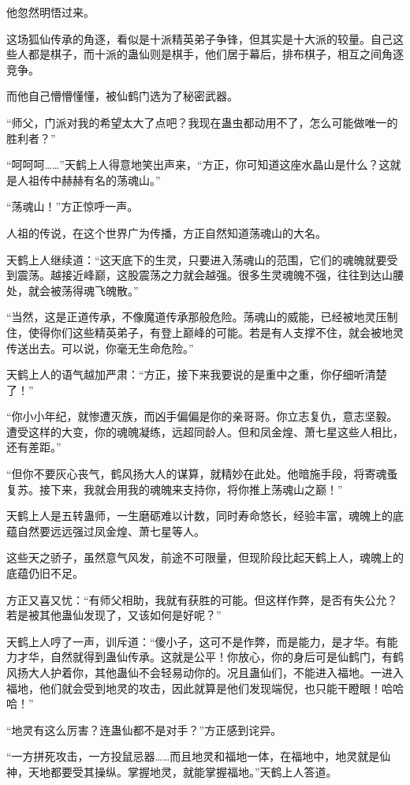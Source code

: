 \begin{this_body}
他忽然明悟过来。

这场狐仙传承的角逐，看似是十派精英弟子争锋，但其实是十大派的较量。自己这些人都是棋子，而十派的蛊仙则是棋手，他们居于幕后，排布棋子，相互之间角逐竞争。

而他自己懵懵懂懂，被仙鹤门选为了秘密武器。

“师父，门派对我的希望太大了点吧？我现在蛊虫都动用不了，怎么可能做唯一的胜利者？”

“呵呵呵……”天鹤上人得意地笑出声来，“方正，你可知道这座水晶山是什么？这就是人祖传中赫赫有名的荡魂山。”

“荡魂山！”方正惊呼一声。

人祖的传说，在这个世界广为传播，方正自然知道荡魂山的大名。

天鹤上人继续道：“这天底下的生灵，只要进入荡魂山的范围，它们的魂魄就要受到震荡。越接近峰巅，这股震荡之力就会越强。很多生灵魂魄不强，往往到达山腰处，就会被荡得魂飞魄散。”

“当然，这是正道传承，不像魔道传承那般危险。荡魂山的威能，已经被地灵压制住，使得你们这些精英弟子，有登上巅峰的可能。若是有人支撑不住，就会被地灵传送出去。可以说，你毫无生命危险。”

天鹤上人的语气越加严肃：“方正，接下来我要说的是重中之重，你仔细听清楚了！”

“你小小年纪，就惨遭灭族，而凶手偏偏是你的亲哥哥。你立志复仇，意志坚毅。遭受这样的大变，你的魂魄凝练，远超同龄人。但和凤金煌、萧七星这些人相比，还有差距。”

“但你不要灰心丧气，鹤风扬大人的谋算，就精妙在此处。他暗施手段，将寄魂蚤复苏。接下来，我就会用我的魂魄来支持你，将你推上荡魂山之巅！”

天鹤上人是五转蛊师，一生磨砺难以计数，同时寿命悠长，经验丰富，魂魄上的底蕴自然要远远强过凤金煌、萧七星等人。

这些天之骄子，虽然意气风发，前途不可限量，但现阶段比起天鹤上人，魂魄上的底蕴仍旧不足。

方正又喜又忧：“有师父相助，我就有获胜的可能。但这样作弊，是否有失公允？若是被其他蛊仙发现了，又该如何是好呢？”

天鹤上人哼了一声，训斥道：“傻小子，这可不是作弊，而是能力，是才华。有能力才华，自然就得到蛊仙传承。这就是公平！你放心，你的身后可是仙鹤门，有鹤风扬大人护着你，其他蛊仙不会轻易动你的。况且蛊仙们，不能进入福地。一进入福地，他们就会受到地灵的攻击，因此就算是他们发现端倪，也只能干瞪眼！哈哈哈！”

“地灵有这么厉害？连蛊仙都不是对手？”方正感到诧异。

“一方拼死攻击，一方投鼠忌器……而且地灵和福地一体，在福地中，地灵就是仙神，天地都要受其操纵。掌握地灵，就能掌握福地。”天鹤上人答道。


\end{this_body}
